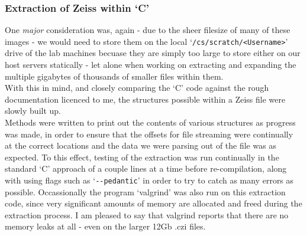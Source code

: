 \subsubsection{Extraction of Zeiss within `C'}
One \emph{major} consideration was, again - due to the sheer filesize of many of these images - we would need
to store them on the local `\verb|/cs/scratch/<Username>|' drive of the lab machines becuase they are simply too
large to store either on our host servers statically - let alone when working on extracting and expanding the
multiple gigabytes of thousands of smaller files within them.\\ With this in mind, and closely comparing the
`C' code against the rough documentation licenced to me, the structures possible within a Zeiss file were
slowly built up.\\
Methods were written to print out the contents of various structures as progress was made, in
order to ensure that the offsets for file streaming were continually at the correct locations and the data we
were parsing out of the file was as expected. To this effect, testing of the extraction was run continually
in the standard `C' approach of a couple lines at a time before re-compilation, along with using flags such as
`\verb|--pedantic|' in order to try to catch as many errors as possible. Occassionally the program `valgrind' was also
run on this extraction code, since very significant amounts of memory are allocated and freed during the
extraction process. I am pleased to say that valgrind reports that there are no memory leaks at all - even
on the larger 12Gb .czi files.\\


